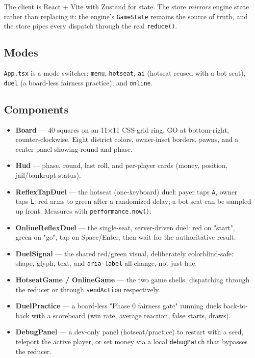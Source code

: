 \documentclass[11pt,a4paper]{article}
\newcommand{\code}[1]{\texttt{#1}}
\begin{document}
The client is React + Vite with Zustand for state. The store \emph{mirrors}
engine state rather than replacing it: the engine's \code{GameState} remains the
source of truth, and the store pipes every dispatch through the real
\code{reduce()}.

\subsection{Modes}
\code{App.tsx} is a mode switcher: \code{menu}, \code{hotseat}, \code{ai}
(hotseat reused with a bot seat), \code{duel} (a board-less fairness practice),
and \code{online}.

\subsection{Components}
\begin{itemize}[leftmargin=1.4em]
  \item \textbf{Board} --- 40 squares on an 11$\times$11 CSS-grid ring, GO at
        bottom-right, counter-clockwise. Eight district colors, owner-inset
        borders, pawns, and a center panel showing round and phase.
  \item \textbf{Hud} --- phase, round, last roll, and per-player cards (money,
        position, jail/bankrupt status).
  \item \textbf{ReflexTapDuel} --- the hotseat (one-keyboard) duel: payer taps
        \code{A}, owner taps \code{L}; red arms to green after a randomized
        delay; a bot seat can be sampled up front. Measures with
        \code{performance.now()}.
  \item \textbf{OnlineReflexDuel} --- the single-seat, server-driven duel: red
        on "start", green on "go", tap on Space/Enter, then wait for the
        authoritative result.
  \item \textbf{DuelSignal} --- the shared red/green visual, deliberately
        colorblind-safe: shape, glyph, text, and \code{aria-label} all change,
        not just hue.
  \item \textbf{HotseatGame / OnlineGame} --- the two game shells, dispatching
        through the reducer or through \code{sendAction} respectively.
  \item \textbf{DuelPractice} --- a board-less "Phase 0 fairness gate" running
        duels back-to-back with a scoreboard (win rate, average reaction, false
        starts, draws).
  \item \textbf{DebugPanel} --- a dev-only panel (hotseat/practice) to restart
        with a seed, teleport the active player, or set money via a local
        \code{debugPatch} that bypasses the reducer.
\end{itemize}
\end{document}

